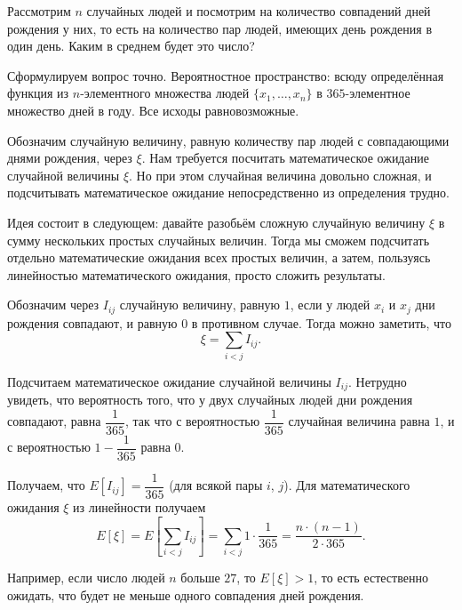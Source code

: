 \documentclass[a4paper]{article}
\begin{document}
\begin{colloq}
        Рассмотрим $n$ случайных людей и посмотрим на количество совпадений дней рождения у них, то есть на количество пар людей, имеющих день рождения в один день. Каким в среднем будет это число?

    Сформулируем вопрос точно. Вероятностное пространство: всюду определённая функция из $n$-элементного множества людей $\{x_1, \dots, x_n\}$ в $365$-элементное множество дней в году. Все исходы равновозможные. 
    
    Обозначим случайную величину, равную количеству пар людей с совпадающими днями рождения, через $\xi$. Нам требуется посчитать математическое ожидание случайной величины $\xi$. Но при этом случайная величина довольно сложная, и подсчитывать математическое ожидание непосредственно из определения трудно.
    
    Идея состоит в следующем: давайте разобьём сложную случайную величину $\xi$ в сумму нескольких простых случайных величин. Тогда мы сможем подсчитать отдельно математические ожидания всех простых величин, а затем, пользуясь линейностью математического ожидания, просто сложить результаты.
 
    Обозначим через $I_{ij}$ случайную величину, равную $1$, если у людей $x_i$ и $x_j$ дни рождения совпадают, и равную $0$ в противном случае. Тогда можно заметить, что
    \begin{equation*}
        \xi = \sum_{i < j} I_{ij}.
    \end{equation*}

    Подсчитаем математическое ожидание случайной величины $I_{ij}$. Нетрудно увидеть, что вероятность того, что у двух случайных людей дни рождения совпадают, равна $\dfrac{1}{365}$, так что с вероятностью $\dfrac{1}{365}$ случайная величина равна $1$, и с вероятностью $1 - \dfrac{1}{365}$ равна $0$.

    Получаем, что $E[I_{ij}] = \dfrac{1}{365}$ (для всякой пары $i$, $j$). Для математического ожидания $\xi$ из линейности получаем
    \begin{equation*}
        E[\xi] = E\left[\sum_{i < j} I_{ij}\right] = \sum_{i < j} 1 \cdot \dfrac{1}{365} = \dfrac{n \cdot (n - 1)}{2 \cdot 365}.
    \end{equation*}

    Например, если число людей $n$ больше $27$, то $E[\xi] > 1$, то есть естественно ожидать, что будет не меньше одного совпадения дней рождения.


\end{colloq}
\end{document}
